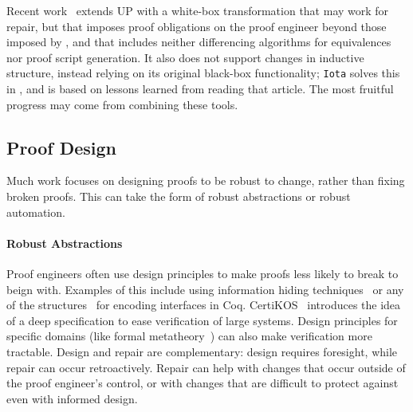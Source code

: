 Recent work~\cite{tabareau2019marriage} extends UP with 
a white-box transformation that may work for repair,
but that imposes proof obligations on the proof engineer beyond those imposed by \toolnamec,
and that includes neither differencing algorithms for equivalences nor proof script generation.
It also does not support changes in inductive structure,
instead relying on its original black-box functionality;
\lstinline{Iota} solves this in \toolnamec, and is based on lessons learned from reading that article.
The most fruitful progress may come from combining these tools. %

\subsection{Proof Design}
\label{sec:design}

Much work focuses on designing proofs
to be robust to change, rather than fixing broken proofs.
This can take the form of robust abstractions or robust automation.


\paragraph{Robust Abstractions}
Proof engineers often use design principles to make proofs less likely to break to beign with.
Examples of this include using 
information hiding techniques~\cite{Woos:2016:PCF:2854065.2854081, Klein:2014:CFV:2584468.2560537}
or any of the structures~\cite{Chrzaszcz2003, Sozeau2008, Saibi:PhD} for encoding interfaces in Coq.
CertiKOS~\cite{certikos} introduces the idea of a deep specification to ease verification of large systems.
Design principles for specific domains (like formal metatheory~\cite{Aydemir2008, Delaware2013POPL, Delaware2013ICFP})
can also make verification more tractable.
Design and repair are complementary: design requires foresight, while repair can occur retroactively.
Repair can help with changes that occur outside of the proof engineer's control,
or with changes that are difficult to protect against even with informed design.

